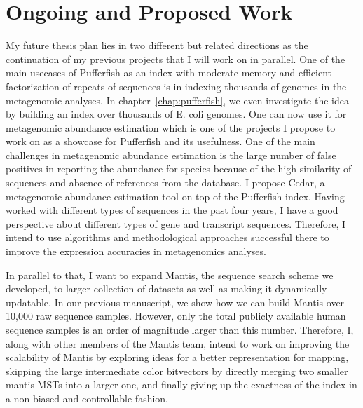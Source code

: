 \section{Ongoing and Proposed Work}
My future thesis plan lies in two different but related directions
as the continuation of my previous projects that I will work on in parallel.
One of the main usecases of Pufferfish as an index with moderate memory
and efficient factorization of repeats of sequences is in indexing thousands of genomes
in the metagenomic analyses. In chapter~\ref{chap:pufferfish}, we even investigate
the idea by building an index over thousands of E. coli genomes.
One can now use it for metagenomic abundance estimation which is one of the projects
I propose to work on as a showcase for Pufferfish and its usefulness.
One of the main challenges in metagenomic abundance estimation is the large number of false positives
in reporting the abundance for species because of the high similarity of sequences
and absence of references from the database.
I propose Cedar, a metagenomic abundance estimation tool on top of the Pufferfish index.
Having worked with different types of sequences in the past four years,
I have a good perspective about different types of gene and transcript sequences.
Therefore, I intend to use algorithms and methodological approaches successful there to
improve the expression accuracies in metagenomics analyses.

In parallel to that, I want to expand Mantis, the sequence search scheme we developed,
to larger collection of datasets as well as making it dynamically updatable.
In our previous manuscript, we show how we can build Mantis over 10,000 raw sequence samples.
However, only the total publicly available human sequence samples is an order of magnitude larger
than this number. Therefore, I, along with other members of the Mantis team,
intend to work on improving the scalability of Mantis
by exploring ideas for a better representation for \kmer mapping, skipping the
large intermediate color bitvectors by directly merging two smaller mantis MSTs into a larger one,
and finally giving up the exactness of the index in a non-biased and controllable fashion.


